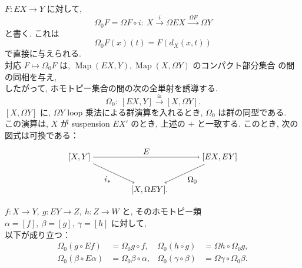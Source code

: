 \documentclass[12pt, leqno]{ltjsarticle}
\newcommand{\Ox}{\Omega}   %
\newcommand{\map}{\operatorname{Map}}
\numberwithin{equation}{section}
\theoremstyle{plain}
\theoremstyle{definition}
\theoremstyle{remark}
\begin{document}
$F:EX\to Y$ に対して,
\[
\Omega_0F=
\Ox F\circ i:\ X\xrightarrow{\ i\ }\Ox EX\xrightarrow{\ \Ox F\ }\Ox Y
\]
と書く. これは
\[
\Omega_0F(x)(t) = F(d_X(x,t))
\]
で直接に与えられる. \\
対応 $F\longmapsto \Omega_0F$ は,
$\map(EX,Y), \map(X,\Omega Y)$ のコンパクト部分集合
の間の同相を与え, \\
したがって, ホモトピー集合の間の次の全単射を誘導する.
\begin{equation}
\Omega_0:\ [EX,Y]\xrightarrow{\ \cong\ }[X, \Ox Y].
\end{equation}
$[X,\Ox Y]$ に, \(\Omega Y\) loop 乗法による群演算を入れるとき, 
\(\Omega_0\) は群の同型である.\\
この演算は, $X$ が suspension $EX'$ のとき, 
上述の $+$ と一致する. このとき, 次の図式は可換である：
\begin{equation}
\begin{tikzpicture}[baseline=(current bounding box.center)]
\node (PX) at (-3,0) {$[X, Y]$};
\node (P1) at (3,0) {$[EX, EY]$};
\node (P2) at (0,-1.4) {$[X, \Ox EY].$};
\draw[->] (PX)--node[above] {$E$} (P1);
\draw[->] (PX)--node[below left] {$i_*$} (P2);
\draw[->] (P1)--node[below right] {$\Omega_0$} (P2);
\end{tikzpicture}
\end{equation}

$f:X\to Y,\ g:EY\to Z,\ h:Z\to W$ と,
そのホモトピー類 $\alpha=[f],\ \beta=[g],\ \gamma=[h]$ に対して, \\
以下が成り立つ：
\begin{equation}
\begin{aligned}
\Omega_0(g\circ Ef)&=\Omega_0 g\circ f, &
\Omega_0(h\circ g)&=\Ox h\circ \Omega_0 g,\\
\Omega_0(\beta\circ E\alpha)&=\Omega_0 \beta\circ \alpha, &
\Omega_0(\gamma\circ \beta)&=\Ox\gamma\circ \Omega_0\beta .
\end{aligned}
\end{equation}
\end{document}
